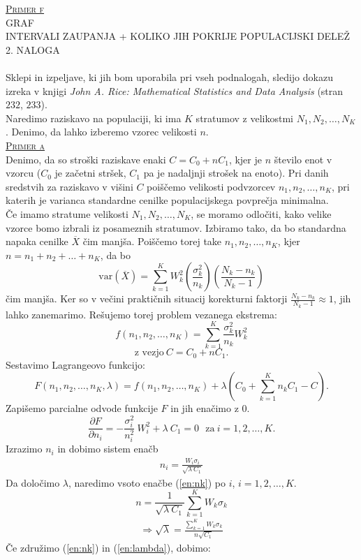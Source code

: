 \documentclass[a4paper,12pt]{article}
\begin{document}

\noindent
\textsc{\underline{Primer f}}
\\
GRAF 
\\
INTERVALI ZAUPANJA + KOLIKO JIH POKRIJE POPULACIJSKI DELEŽ
\\


\noindent
\textsc{\large{2. NALOGA}}
\\
\\
Sklepi in izpeljave, ki jih bom uporabila pri vseh podnalogah, sledijo dokazu izreka v knjigi \textit{John A. Rice: Mathematical Statistics and Data Analysis} (stran $232$, $233$).
\\
Naredimo raziskavo na populaciji, ki ima $K$ stratumov z velikostmi $N_1, N_2, \ldots, N_K$. Denimo, da lahko izberemo vzorec velikosti $n$.
\\

\noindent
\textsc{\underline{Primer a}}
\\
Denimo, da so stroški raziskave enaki $C = C_0 + n C_1$, kjer je $n$ število enot v vzorcu ($C_0$ je začetni stršek, $C_1$ pa je nadaljnji strošek na enoto). Pri danih sredstvih za raziskavo v višini $C$ poiščemo velikosti podvzorcev $n_1, n_2, \ldots, n_K$, pri katerih je varianca standardne cenilke populacijskega povprečja minimalna.
\\
Če imamo stratume velikosti $N_1, N_2, \ldots, N_K$, se moramo odločiti, kako velike vzorce bomo izbrali iz posameznih stratumov. Izbiramo tako, da bo standardna napaka cenilke $\overline{X}$ čim manjša. 
Poiščemo torej take $n_1, n_2, \ldots, n_K$, kjer $n = n_1 + n_2 + \ldots + n_K$, da bo $$ \text{var}(\overline{X}) = \sum_{k = 1}^{K} W_k ^ 2 \left( \frac{ \sigma_k^2}{n_k} \right) \left( \frac{N_k - n_k}{N_k - 1} \right) $$
čim manjša.
Ker so v večini praktičnih situacij korekturni faktorji $\frac{N_k - n_k}{N_k - 1} \approx 1$, jih lahko zanemarimo. Rešujemo torej problem vezanega ekstrema:
$$ f(n_1, n_2, \ldots, n_K) = \sum_{k = 1}^{K} \frac{\sigma_k^2}{n_k} W_k^2 $$
$$ \text{z vezjo} \  C = C_0 + nC_1.$$
Sestavimo Lagrangeovo funkcijo:
$$ F(n_1, n_2, \ldots, n_K, \lambda) = f(n_1, n_2, \ldots, n_K) + \lambda (C_0 + \sum_{k = 1}^{K} n_k C_1 - C). $$
Zapišemo parcialne odvode funkcije $F$ in jih enačimo z $0$.
$$ \frac{ \partial F}{\partial n_i} = - \frac{ \sigma_i^2}{n_i^2} \  W_i^2 + \lambda \ C_1 = 0 \ \ \ \text{za} \ i = 1, 2, \ldots, K. $$
Izrazimo $n_i$ in dobimo sistem enačb
\begin{align}\label{en:nk}
n_i = \frac{W_i \sigma_i}{ \sqrt{ \lambda \ C_1}}
\end{align}
Da določimo $\lambda$, naredimo vsoto enačbe (\ref{en:nk}) po $i$, $i = 1, 2, \ldots, K.$
$$ n = \frac{1}{\sqrt{\lambda \ C_1}} \sum_{k = 1}^{K} W_k \sigma_k $$
\begin{align}\label{en:lambda}
\Rightarrow \sqrt{\lambda} = \frac{\sum_{k = 1}^{K} W_k \sigma_k}{n \sqrt{C_1}}
\end{align}
Če združimo (\ref{en:nk}) in (\ref{en:lambda}), dobimo:
\end{document}
